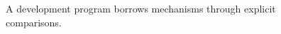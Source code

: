 \begin{figure}[H]
\centering
{}
\caption{A development program borrows mechanisms through explicit comparisons.}\label{fig:teach-P-02-literature-09}
\end{figure}
